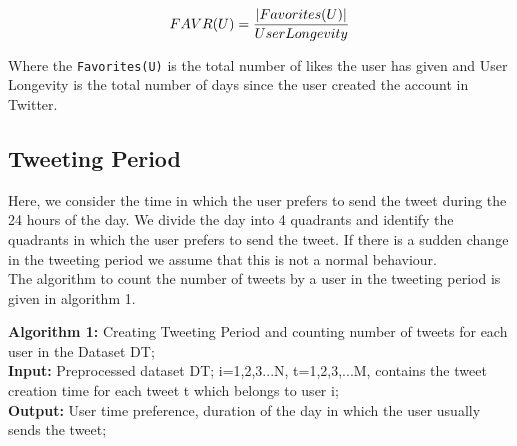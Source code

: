 \documentclass[conference]{IEEEtran}
\begin{document}
\begin{equation}
	FAVR (U) = \frac{|Favorites(U)|}{User Longevity} \\
\end{equation}

Where the \verb |Favorites(U)| is the total number of likes the user has given and User Longevity is the total number of days since the user created the account in Twitter.

\subsection{Tweeting Period}
Here, we consider the time in which the user prefers to send the tweet during the 24 hours of the day. We divide the day into 4 quadrants and identify the quadrants in which the user prefers to send the tweet. If there is a sudden change in the tweeting period we assume that this is not a normal behaviour. \\

The algorithm to count the number of tweets by a user in the tweeting period is given in algorithm 1.

\textbf{Algorithm 1:} Creating Tweeting Period and counting number of tweets for each user in the Dataset DT; \\
\textbf{Input:} Preprocessed dataset DT; i=1,2,3...N, t=1,2,3,...M, contains the tweet creation time for each tweet t which belongs to user i;\\
\textbf{Output:} User time preference, duration of the day in which the user usually sends the tweet; \\
\end{document}
